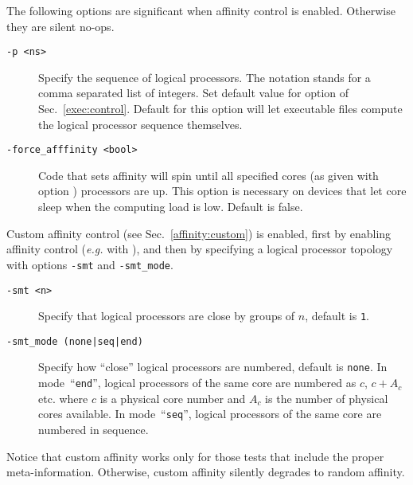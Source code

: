The following options are significant when affinity control is enabled.
Otherwise they are silent no-ops.
\begin{description}
\item[{\tt -p <ns>}]
Specify the sequence of logical processors.
The notation  stands for a comma separated list of integers.
Set default value for option  of Sec.~\ref{exec:control}.
Default for this  option
will let executable files compute the logical processor sequence
themselves.
\item[{\tt -force\_afffinity <bool>}]
Code that sets affinity will spin until all specified
cores (as given with option ) processors
are up. This option is necessary on devices that let core sleep
when the computing load is low. Default is false.
\end{description}

Custom affinity control (see Sec.~\ref{affinity:custom}) is enabled,
first by enabling affinity control (\emph{e.g.} with ),
and then by specifying a logical processor topology with options \texttt{-smt}
and \texttt{-smt\_mode}.
\begin{description}
\item[{\tt -smt <n>}] Specify that logical processors are close by groups
of $n$, default is \texttt{1}.
\item[{\tt -smt\_mode (none|seq|end)}] Specify how ``close'' logical processors
are numbered, default is \texttt{none}.
In mode~``\texttt{end}'', logical processors of the same core
are numbered as $c$, $c+A_c$ etc. where $c$ is a physical core number and
$A_c$ is the number of physical cores available.
In mode~``\texttt{seq}'', logical processors of the same core
are numbered in sequence.
\end{description}
Notice that custom affinity works only for those tests that include the proper
meta-information. Otherwise, custom affinity silently degrades
to random affinity.

